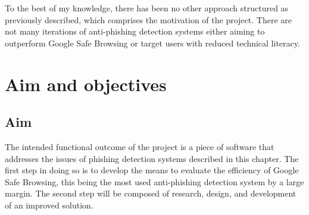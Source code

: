 To the best of my knowledge, there has been no other approach structured as
previously described, which comprises the motivation of the project. There are
not many iterations of anti-phishing detection systems either aiming to outperform Google Safe Browsing or target users with reduced technical literacy.

\section{Aim and objectives}

\subsection{Aim}
The intended functional outcome of the project is a piece of software that
addresses the issues of phishing detection systems described in this
chapter. The first step in doing so is to develop the means to evaluate the
efficiency of Google Safe Browsing, this being the most used anti-phishing
detection system by a large margin. The second step will be composed of research, design, and
development of an improved solution.

